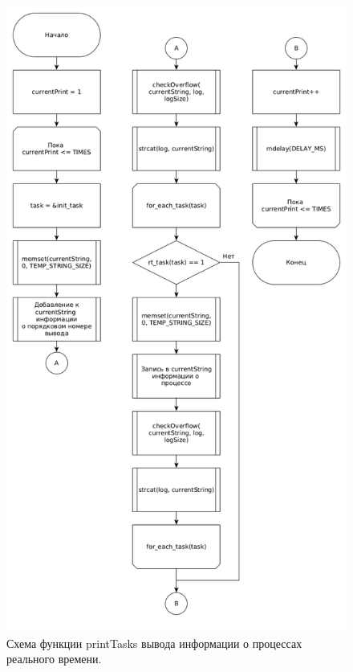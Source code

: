 \begin{figure}[H]
	\centering
	\includegraphics[scale=0.5]{img/printTasks.png}
	\caption{Схема функции printTasks вывода информации о процессах реального времени. }
	\label{fig:printTasks}
\end{figure}

